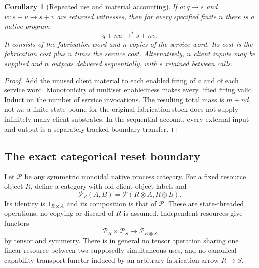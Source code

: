 \documentclass[11pt]{article}
\newtheorem{corollary}[theorem]{Corollary}
\theoremstyle{definition}
\theoremstyle{remark}
\begin{document}
\begin{corollary}[Repeated use and material accounting]\label{er:cor:reuse}
If $a:q\to s$ and $w:s+u\to s+v$ are returned witnesses, then for every specified finite $n$ there is a native program
\[
 q+n u\longrightarrow^*s+n v.
\]
It consists of the fabrication word and $n$ copies of the service word. Its cost is the fabrication cost plus $n$ times the service cost. Alternatively, $n$ client inputs may be supplied and $n$ outputs delivered sequentially, with $s$ retained between calls.
\end{corollary}
\begin{proof}
Add the unused client material to each enabled firing of $a$ and of each service word. Monotonicity of multiset enabledness makes every lifted firing valid. Induct on the number of service invocations. The resulting total mass is $m+n d$, not $m$; a finite-state bound for the original fabrication stock does not supply infinitely many client substrates. In the sequential account, every external input and output is a separately tracked boundary transfer.
\end{proof}

\subsection{The exact categorical reset boundary}
Let $\mathcal P$ be any symmetric monoidal native process category. For a fixed resource object $R$, define a category with old client object labels and
\[
 \mathcal P_R(A,B)=\mathcal P(R\otimes A,R\otimes B).
\]
Its identity is $1_{R\otimes A}$ and its composition is that of $\mathcal P$. These are state-threaded operations; no copying or discard of $R$ is assumed. Independent resources give functors
\[
 \mathcal P_R\times\mathcal P_S\longrightarrow\mathcal P_{R\otimes S}
\]
by tensor and symmetry. There is in general no tensor operation sharing one linear resource between two supposedly simultaneous uses, and no canonical capability-transport functor induced by an arbitrary fabrication arrow $R\to S$.
\end{document}
